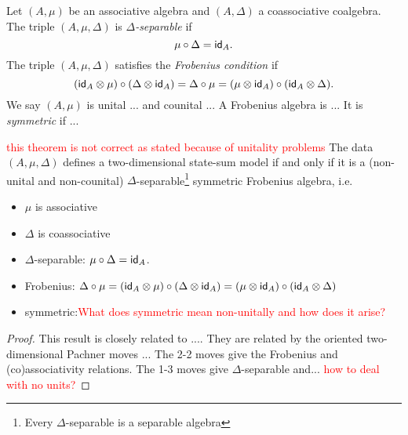 \begin{definition}
	Let $(A, \mu)$ be an associative algebra and $(A,\Delta)$ a coassociative coalgebra.
	The triple $(A,\mu,\Delta)$ is \textit{$\Delta$-separable} if
	\[
	\mu \circ \Delta = \mathsf{id}_A.
	\]
	The triple $(A,\mu,\Delta)$ satisfies the \textit{Frobenius condition} if
	\[
	(\mathsf{id}_A \otimes \mu) \circ (\Delta \otimes \mathsf{id}_A) = \Delta \circ \mu = (\mu \otimes \mathsf{id}_A) \circ (\mathsf{id}_A \otimes \Delta).
	\]
	We say $(A,\mu)$ is unital ... and counital ...
	A Frobenius algebra is ...
	It is \textit{symmetric} if ...
\end{definition}

\begin{theorem}\textcolor{red}{this theorem is not correct as stated because of unitality problems}
    The data $(A, \mu, \Delta)$ defines a two-dimensional state-sum model if and only if it is a (non-unital and non-counital) $\Delta$-separable\footnote{Every $\Delta$-separable is a separable algebra} symmetric Frobenius algebra, i.e.
    \begin{itemize}
        \item $\mu$ is associative
        \item $\Delta$ is coassociative
        \item $\Delta$-separable: $\mu \circ \Delta = \mathsf{id}_A$.
        \item Frobenius: $\Delta \circ \mu = (\mathsf{id}_A \otimes \mu) \circ (\Delta \otimes \mathsf{id}_A) = (\mu \otimes \mathsf{id}_A) \circ (\mathsf{id}_A \otimes \Delta)$
        \item symmetric:\textcolor{red}{What does symmetric mean non-unitally and how does it arise?}
    \end{itemize}
\end{theorem}
\begin{proof}
    This result is closely related to \cite[Proposition 3.4]{carqueville2016orbifoldcompletion}....
    They are related by the oriented two-dimensional Pachner moves \cite[Example 3.4(i)]{carqueville2019orbifolds}...
    The 2-2 moves give the Frobenius and (co)associativity relations.
    The 1-3 moves give $\Delta$-separable and... \textcolor{red}{how to deal with no units?}
\end{proof}

